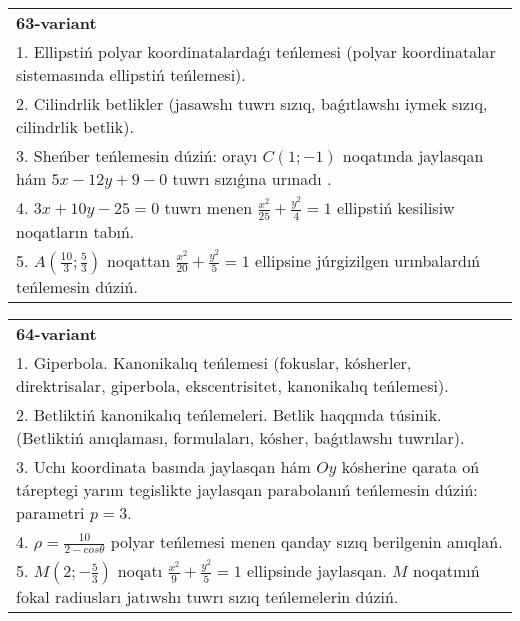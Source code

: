 \documentclass{article}
\begin{document}
\begin{tabular}{m{17cm}}
\textbf{63-variant}\\
1. Ellipstiń polyar koordinatalardaǵı teńlemesi (polyar koordinatalar sistemasında ellipstiń teńlemesi).\\

2. Cilindrlik betlikler (jasawshı tuwrı sızıq, baǵıtlawshı iymek sızıq, cilindrlik betlik).\\

3. Sheńber teńlemesin dúziń: orayı $C (1;-1) $ noqatında jaylasqan hám $5 x-12 y+9 -0$ tuwrı sızıǵına urınadı .\\

4. $3x + 10y - 25 = 0$ tuwrı menen $\frac{x^{2}}{25} + \frac{y^{2}}{4} = 1$ ellipstiń kesilisiw noqatların tabıń.\\

5. $A(\frac{10}{3};\frac{5}{3})$ noqattan $\frac{x^{2}}{20} + \frac{y^{2}}{5} = 1$ ellipsine júrgizilgen urınbalardıń teńlemesin dúziń.  
\end{tabular}
\vspace{1cm}


\begin{tabular}{m{17cm}}
\textbf{64-variant}\\
1. Giperbola. Kanonikalıq teńlemesi (fokuslar, kósherler, direktrisalar, giperbola, ekscentrisitet, kanonikalıq teńlemesi).\\

2. Betliktiń kanonikalıq teńlemeleri. Betlik haqqında túsinik. (Betliktiń anıqlaması, formulaları, kósher, baǵıtlawshı tuwrılar).\\

3. Uchı koordinata basında jaylasqan hám $Oy$ kósherine qarata oń táreptegi yarım tegislikte jaylasqan parabolanıń teńlemesin dúziń: parametri $p=3$.\\

4. $\rho = \frac{10}{2 - cos\theta}$ polyar teńlemesi menen qanday sızıq berilgenin anıqlań.  \\

5. $M(2; - \frac{5}{3})$ noqatı $\frac{x^{2}}{9} + \frac{y^{2}}{5} = 1$ ellipsinde jaylasqan. $M$ noqatınıń fokal radiusları jatıwshı tuwrı sızıq teńlemelerin dúziń.  
\end{tabular}
\vspace{1cm}
\end{document}
